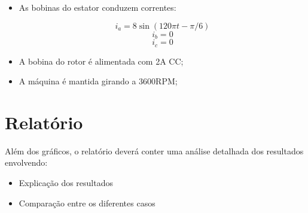 \documentclass[a4paper]{article}
\theoremstyle{definition}
\theoremstyle{plain}
\begin{document}
\begin{itemize}
\item As bobinas do estator conduzem correntes:
	
	\begin{equation}
		i_a = 8 \sin(120\pi t - \pi/6)
	\end{equation}
	\begin{equation}
		i_b = 0
	\end{equation}
	\begin{equation}
		i_c = 0
	\end{equation}

\item A bobina do rotor é alimentada com 2A CC;
\item A máquina é mantida girando a 3600RPM;
\end{itemize}





\section{Relatório}

Além dos gráficos, o relatório deverá conter uma análise detalhada dos resultados envolvendo:

\begin{itemize}
\item Explicação dos resultados
\item Comparação entre os diferentes casos
\end{itemize}
\end{document}

